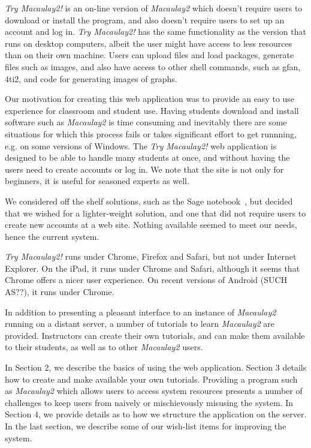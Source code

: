 \documentclass[]{article}
\begin{document}
{\it Try Macaulay2!} is an on-line version of {\it Macaulay2} which
doesn't require users to download or install the program, and also
doesn't require users to set up an account and log in.  {\it Try
  Macaulay2!}  has the same functionality as the version that runs on
desktop computers, albeit the user might have access to less resources
than on their own machine.  Users can upload files and
load packages, generate files such as images, and also have
access to other shell commands, such as gfan, 4ti2, and code for
generating images of graphs.

Our motivation for creating this web application was to provide an
easy to use experience for classroom and student use.  Having students
download and install software such as {\it Macaulay2} is time
consuming and inevitably there are some situations for which this
process fails or takes significant effort to get runnning, e.g. on
some versions of Windows.  The {\it Try Macaulay2!} web application is
designed to be able to handle many students at once, and without
having the users need to create accounts or log in.  We note that the
site is not only for beginners, it is useful for seasoned experts as
well.

We considered off the shelf solutions, such as the Sage
notebook~\cite{sagenotebook}, but decided that we wished for a
lighter-weight solution, and one that did not require users to create
new accounts at a web site.  Nothing available seemed to meet our
needs, hence the current system.

{\it Try Macaulay2!} runs under Chrome, Firefox and Safari, but not
under Internet Explorer.  On the iPad, it runs under Chrome and
Safari, although it seems that Chrome offers a nicer user experience.
On recent versions of Android (SUCH AS??), it runs under Chrome.

In addition to presenting a pleasant interface to an instance of {\it
  Macaulay2} running on a distant server, a number of tutorials to
learn {\it Macaulay2} are provided.  Instructors can create their own
tutorials, and can make them available to their students, as well as
to other {\it Macaulay2} users.  

In Section 2, we describe the basics of using the web application.
Section 3 details how to create and make available your own tutorials.
Providing a program such as {\it Macaulay2} which allows users to
access system resources presents a number of challenges to keep users
from naively or mischievously misusing the system.  In Section 4, we
provide details as to how we structure the application on the server.
In the last section, we describe some of our wish-list items for
improving the system.
\end{document}

